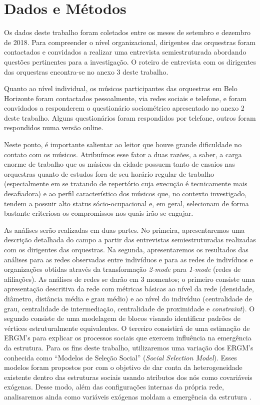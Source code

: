\documentclass[a4paper, 12pt, openright, oneside, german, french, english, brazil]{abntex2}
\begin{document}
	\chapter{Dados e Métodos}
	
	Os dados deste trabalho foram coletados entre os meses de setembro e dezembro de 2018. Para compreender o nível organizacional, dirigentes das orquestras foram contactados e convidados a realizar uma entrevista semiestruturada abordando questões pertinentes para a investigação. O roteiro de entrevista com os dirigentes das orquestras encontra-se no anexo 3 deste trabalho.
	
	Quanto ao nível individual, os músicos participantes das orquestras em Belo Horizonte foram contactados pessoalmente, via redes sociais e telefone, e foram convidados a responderem o questionário sociométrico apresentado no anexo 2 deste trabalho. Alguns questionários foram respondidos por telefone, outros foram respondidos numa versão online.
	
	Neste ponto, é importante salientar ao leitor que houve grande dificuldade no contato com os músicos. Atribuímos esse fator a duas razões, a saber, a carga enorme de trabalho que os músicos da cidade possuem tanto de ensaios nas orquestras quanto de estudos fora de seu horário regular de trabalho (especialmente em se tratando de repertório cuja execução é tecnicamente mais desafiadora) e ao perfil característico dos músicos que, no contexto investigado, tendem a possuir alto status sócio-ocupacional e, em geral, selecionam de forma bastante criteriosa os compromissos nos quais irão se engajar.
	
	As análises serão realizadas em duas partes. No primeira, apresentaremos uma descrição detalhada do campo a partir das entrevistas semiestruturadas realizadas com os dirigentes das orquestras. Na segunda, apresentaremos os resultados das análises para as redes observadas entre indivíduos e para as redes de indivíduos e organizações obtidas através da transformação \textit{2-mode} para \textit{1-mode} (redes de afiliações). As análises de redes se darão em 3 momentos; o primeiro consiste uma apresentação descritiva da rede com métricas básicas ao nível da rede (densidade, diâmetro, distância média e grau médio) e ao nível do indivíduo (centralidade de grau, centralidade de intermediação, centralidade de proximidade e \textit{constraint}). O segundo consiste de uma modelagem de blocos visando identificar padrões de vértices estruturalmente equivalentes. O terceiro consistirá de uma estimação de ERGM's para explicar os processos sociais que exercem influência na emergência da estrutura. Para os fins deste trabalho, utilizaremos uma variação dos ERGM's conhecida como ``Modelos de Seleção Social'' (\textit{Social Selection Model}). Esses modelos foram propostos por  com o objetivo de dar conta da heterogeneidade existente dentro das estruturas sociais usando atributos dos nós como covariáveis exógenas. Desse modo, além das configurações internas da própria rede, analisaremos ainda como variáveis exógenas moldam a emergência da estrutura \cite{wang2016social}.
\end{document}
